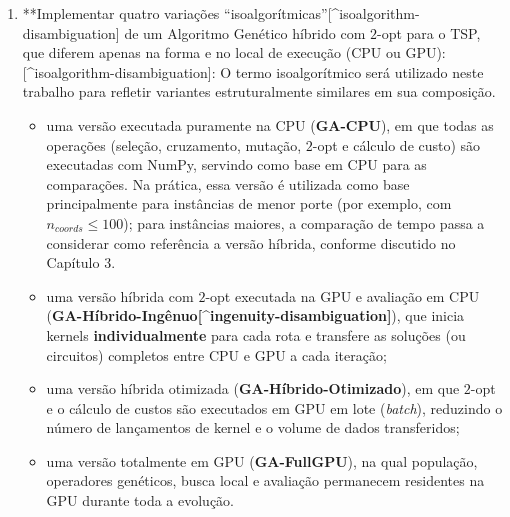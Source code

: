 \begin{enumerate}
\def\labelenumi{\arabic{enumi}.}
\item
  **Implementar quatro variações
  ``isoalgorítmicas''{[}\^{}isoalgorithm-disambiguation{]} de um
  Algoritmo Genético híbrido com \(2\)-opt para o TSP, que diferem
  apenas na forma e no local de execução (CPU ou GPU):
  {[}\^{}isoalgorithm-disambiguation{]}: O termo isoalgorítmico será
  utilizado neste trabalho para refletir variantes estruturalmente
  similares em sua composição.

  \begin{itemize}
  \tightlist
  \item
    uma versão executada puramente na CPU (\textbf{GA-CPU}), em que
    todas as operações (seleção, cruzamento, mutação, \(2\)-opt e
    cálculo de custo) são executadas com NumPy, servindo como base em
    CPU para as comparações. Na prática, essa versão é utilizada como
    base principalmente para instâncias de menor porte (por exemplo, com
    \(n_{coords} \leq 100\)); para instâncias maiores, a comparação de
    tempo passa a considerar como referência a versão híbrida, conforme
    discutido no Capítulo 3.
  \item
    uma versão híbrida com \(2\)-opt executada na GPU e avaliação em CPU
    (\textbf{GA-Híbrido-Ingênuo{[}\^{}ingenuity-disambiguation{]}}), que
    inicia kernels \textbf{individualmente} para cada rota e transfere
    as soluções (ou circuitos) completos entre CPU e GPU a cada
    iteração;
  \item
    uma versão híbrida otimizada (\textbf{GA-Híbrido-Otimizado}), em que
    \(2\)-opt e o cálculo de custos são executados em GPU em lote
    (\emph{batch}), reduzindo o número de lançamentos de kernel e o
    volume de dados transferidos;
  \item
    uma versão totalmente em GPU (\textbf{GA-FullGPU}), na qual
    população, operadores genéticos, busca local e avaliação permanecem
    residentes na GPU durante toda a evolução.
  \end{itemize}


\end{enumerate}
